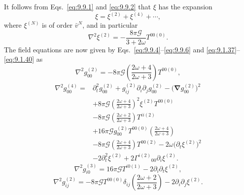 It follows from Eqs.~\eqref{eq:9.9.1} and \eqref{eq:9.9.2} that \(\xi\)
has the expansion
\begin{equation}
  \xi=\xi^{(2)}+\xi^{(4)}+\cdots,
  \tag{9.9.5}\label{eq:9.9.5}
\end{equation}
where \(\xi^{(N)}\) is of order \(\bar v^N\), and in particular
\begin{equation}
  \nabla^2\xi^{(2)}
  =
  -\frac{8\pi\mathcal G}{3+2\omega}T^{00(0)}.
  \tag{9.9.6}\label{eq:9.9.6}
\end{equation}
The field equations are now given by
Eqs.~\eqref{eq:9.9.4}--\eqref{eq:9.9.6} and
\eqref{eq:9.1.37}--\eqref{eq:9.1.40} as
\begin{equation}
  \nabla^2g_{00}^{(2)}
  =
  -8\pi\mathcal G
  \left(\frac{2\omega+4}{2\omega+3}\right)T^{00(0)},
  \tag{9.9.7}\label{eq:9.9.7}
\end{equation}
\begin{equation}
  \begin{split}
  \nabla^2g_{00}^{(4)}
  ={}&
  \partial_t^2g_{00}^{(2)}
  +g_{ij}^{(2)}\partial_i\partial_jg_{00}^{(2)}
  -\bigl(\boldsymbol\nabla g_{00}^{(2)}\bigr)^2\\
  &+8\pi\mathcal G
   \left(\frac{2\omega+4}{2\omega+3}\right)^2
   \xi^{(2)}T^{00(0)}\\
  &-8\pi\mathcal G
   \left(\frac{2\omega+2}{2\omega+3}\right)T^{ii(2)}\\
  &+16\pi\mathcal G g_{00}^{(2)}T^{00(0)}
   \left(\frac{2\omega+4}{2\omega+3}\right)\\
  &-8\pi\mathcal G
   \left(\frac{2\omega+4}{2\omega+3}\right)T^{00(2)}
  -2\omega\bigl(\partial_t\xi^{(2)}\bigr)^2\\
  &-2\partial_t^2\xi^{(2)}
  +2\Gamma^{i(2)}{}_{00}\partial_i\xi^{(2)}.
  \end{split}
  \tag{9.9.8}\label{eq:9.9.8}
\end{equation}
\begin{equation}
  \nabla^2g_{i0}^{(3)}
  =
  16\pi\mathcal G T^{i0(1)}
  -2\partial_i\partial_t\xi^{(2)},
  \tag{9.9.9}\label{eq:9.9.9}
\end{equation}
\begin{equation}
  \nabla^2g_{ij}^{(2)}
  =
  -8\pi\mathcal G T^{00(0)}\delta_{ij}
   \left(\frac{2\omega+2}{2\omega+3}\right)
  -2\partial_i\partial_j\xi^{(2)}.
  \tag{9.9.10}\label{eq:9.9.10}
\end{equation}

